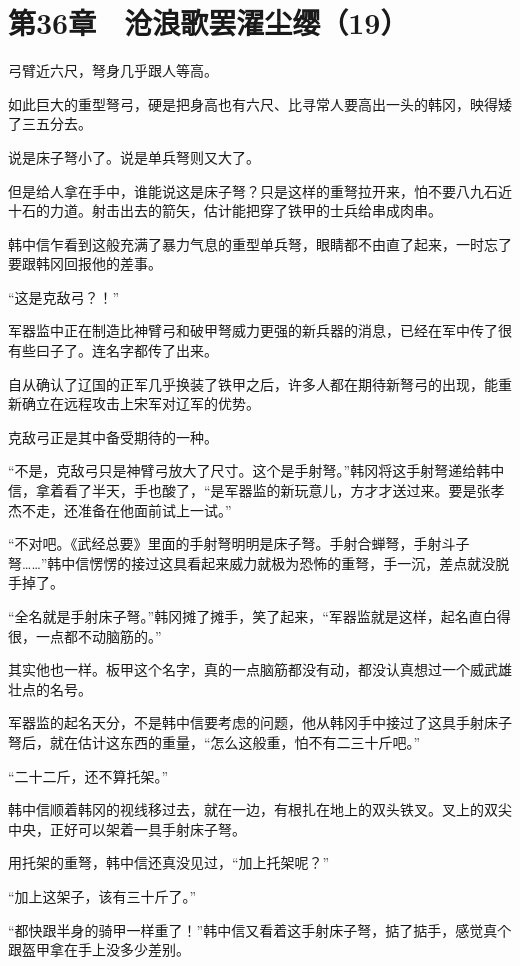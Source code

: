 \section{第36章　沧浪歌罢濯尘缨（19）}

弓臂近六尺，弩身几乎跟人等高。

如此巨大的重型弩弓，硬是把身高也有六尺、比寻常人要高出一头的韩冈，映得矮了三五分去。

说是床子弩小了。说是单兵弩则又大了。

但是给人拿在手中，谁能说这是床子弩？只是这样的重弩拉开来，怕不要八九石近十石的力道。射击出去的箭矢，估计能把穿了铁甲的士兵给串成肉串。

韩中信乍看到这般充满了暴力气息的重型单兵弩，眼睛都不由直了起来，一时忘了要跟韩冈回报他的差事。

“这是克敌弓？！”

军器监中正在制造比神臂弓和破甲弩威力更强的新兵器的消息，已经在军中传了很有些曰子了。连名字都传了出来。

自从确认了辽国的正军几乎换装了铁甲之后，许多人都在期待新弩弓的出现，能重新确立在远程攻击上宋军对辽军的优势。

克敌弓正是其中备受期待的一种。

“不是，克敌弓只是神臂弓放大了尺寸。这个是手射弩。”韩冈将这手射弩递给韩中信，拿着看了半天，手也酸了，“是军器监的新玩意儿，方才才送过来。要是张孝杰不走，还准备在他面前试上一试。”

“不对吧。《武经总要》里面的手射弩明明是床子弩。手射合蝉弩，手射斗子弩……”韩中信愣愣的接过这具看起来威力就极为恐怖的重弩，手一沉，差点就没脱手掉了。

“全名就是手射床子弩。”韩冈摊了摊手，笑了起来，“军器监就是这样，起名直白得很，一点都不动脑筋的。”

其实他也一样。板甲这个名字，真的一点脑筋都没有动，都没认真想过一个威武雄壮点的名号。

军器监的起名天分，不是韩中信要考虑的问题，他从韩冈手中接过了这具手射床子弩后，就在估计这东西的重量，“怎么这般重，怕不有二三十斤吧。”

“二十二斤，还不算托架。”

韩中信顺着韩冈的视线移过去，就在一边，有根扎在地上的双头铁叉。叉上的双尖中央，正好可以架着一具手射床子弩。

用托架的重弩，韩中信还真没见过，“加上托架呢？”

“加上这架子，该有三十斤了。”

“都快跟半身的骑甲一样重了！”韩中信又看着这手射床子弩，掂了掂手，感觉真个跟盔甲拿在手上没多少差别。

